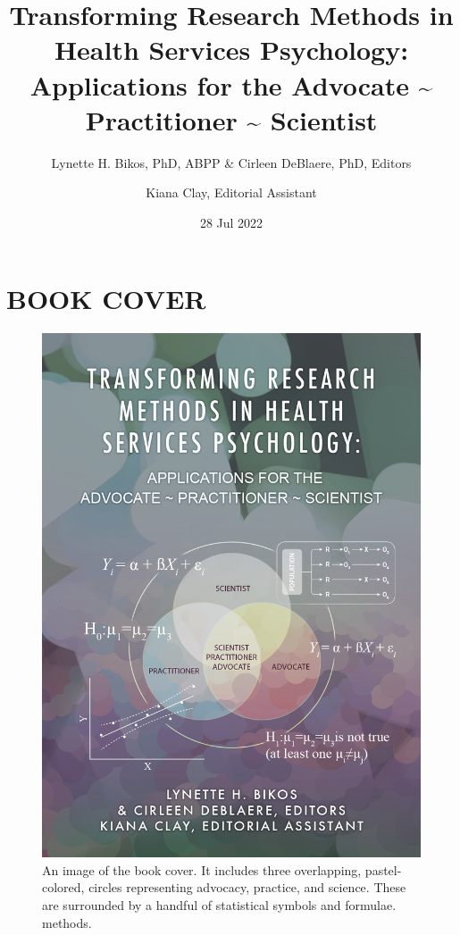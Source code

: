 \documentclass[
  11pt,
]{book}
\title{Transforming Research Methods in Health Services Psychology: Applications for the Advocate \textasciitilde{} Practitioner \textasciitilde{} Scientist}
\author{Lynette H. Bikos, PhD, ABPP \& Cirleen DeBlaere, PhD, Editors \and Kiana Clay, Editorial Assistant}
\date{28 Jul 2022}
\begin{document}
\maketitle

{
\hypersetup{linkcolor=}
\setcounter{tocdepth}{3}
\tableofcontents
}
\hypertarget{book-cover}{%
\chapter*{BOOK COVER}\label{book-cover}}

\begin{figure}
\centering
\includegraphics{images/bookcover.png}
\caption{An image of the book cover. It includes three overlapping, pastel-colored, circles representing advocacy, practice, and science. These are surrounded by a handful of statistical symbols and formulae. methods.}
\end{figure}
\end{document}
